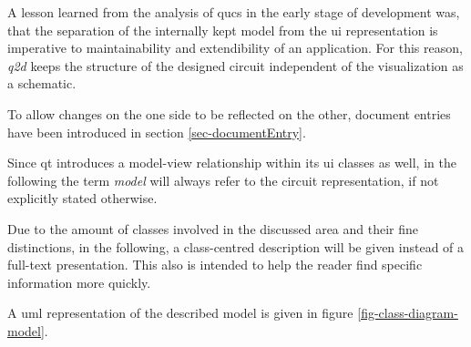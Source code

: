 A lesson learned from the analysis of \gls{qucs} in the early stage of development was, that the separation of the internally kept model from the \gls{ui} representation is imperative to maintainability and extendibility of an application.
For this reason, \emph{q2d} keeps the structure of the designed circuit independent of the visualization as a schematic. 

To allow changes on the one side to be reflected on the other, document entries have been introduced in section \ref{sec-documentEntry}.

Since \gls{qt} introduces a model-view relationship within its \gls{ui} classes as well, in the following the term \emph{model} will always refer to the circuit representation, if not explicitly stated otherwise.

Due to the amount of classes involved in the discussed area and their fine distinctions, in the following, a class-centred description will be given instead of a full-text presentation.
This also is intended to help the reader find specific information more quickly.

A \gls{uml} representation of the described model is given in figure \ref{fig-class-diagram-model}.
